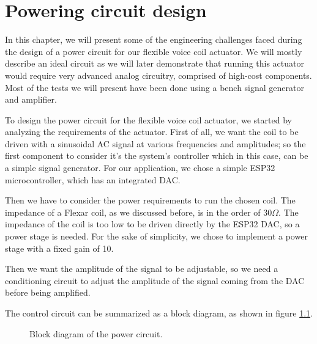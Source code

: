 
\chapter{Powering circuit design} %
\label{Chapter4}
In this chapter, we will present some of the engineering challenges faced during the design of a power circuit for our flexible voice coil actuator.
We will mostly describe an ideal circuit as we will later demonstrate that running this actuator would require very advanced analog circuitry, comprised of high-cost components.
Most of the tests we will present have been done using a bench signal generator and amplifier.


To design the power circuit for the flexible voice coil actuator, we started by analyzing the requirements of the actuator.
First of all, we want the coil to be driven with a sinusoidal AC signal at various frequencies and amplitudes; so the first component to consider it's the system's controller which in this case, can be a simple signal generator.
For our application, we chose a simple ESP32 microcontroller, which has an integrated DAC.
\bigskip

Then we have to consider the power requirements to run the chosen coil.
The impedance of a Flexar coil, as we discussed before, is in the order of 30$\Omega$.
The impedance of the coil is too low to be driven directly by the ESP32 DAC, so a power stage is needed.
For the sake of simplicity, we chose to implement a power stage with a fixed gain of 10.
\bigskip

Then we want the amplitude of the signal to be adjustable, so we need a conditioning circuit to adjust the amplitude of the signal coming from the DAC before being amplified.
\bigskip

The control circuit can be summarized as a block diagram, as shown in figure \ref{fig:Power_Circuit_Block_Diagram}.
\begin{figure}[H]
    \centering
    \caption{Block diagram of the power circuit.}
    \label{fig:Power_Circuit_Block_Diagram}    
\end{figure}

